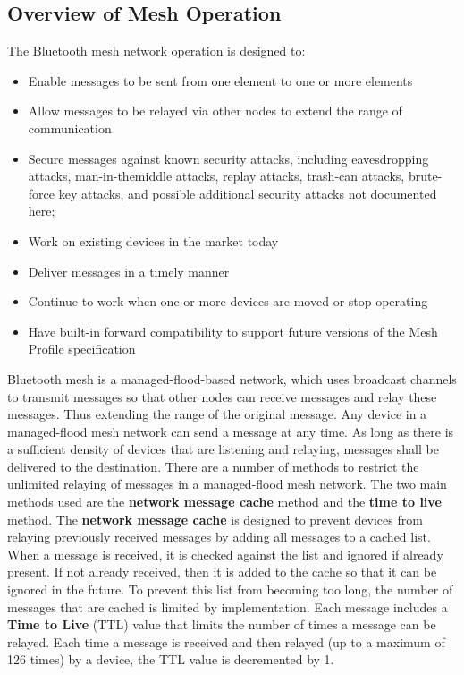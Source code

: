 \documentclass[\main/main.tex]{subfiles}
\begin{document}
\subsection{Overview of Mesh Operation \cite{bluetooth_sig:mesh_profile_specification_1_0_1}}
The Bluetooth mesh network operation is designed to:
\begin{itemize}
    \item Enable messages to be sent from one element to one or more elements
    \item Allow messages to be relayed via other nodes to extend the range of communication
    \item Secure messages against known security attacks, including eavesdropping attacks, man-in-themiddle attacks, replay attacks, trash-can attacks, brute-force key attacks, and possible additional security attacks not documented here;
    \item Work on existing devices in the market today
    \item Deliver messages in a timely manner
    \item Continue to work when one or more devices are moved or stop operating
    \item Have built-in forward compatibility to support future versions of the Mesh Profile specification
\end{itemize}

Bluetooth mesh is a managed-flood-based network, which uses  broadcast channels to transmit messages so that other nodes can receive messages and relay these messages. Thus extending the range of the original message. Any device in a managed-flood mesh network can send a message at any time. As long as there is a sufficient density of devices that are listening and relaying, messages shall be delivered to the destination. 
\newline\newline
There are a number of methods to restrict the unlimited relaying of messages in a managed-flood mesh network. The two main methods used are the \textbf{network message cache} method and the \textbf{time to live} method.
\newline\newline
The \textbf{network message cache} is designed to prevent devices from relaying previously received messages by adding all messages to a cached list. When a message is received, it is checked against the list and ignored if already present. If not already received, then it is added to the cache so that it can be ignored in the future. To prevent this list from becoming too long, the number of messages that are cached is limited by implementation.
\newline\newline
Each message includes a \textbf{Time to Live} (TTL) value that limits the number of times a message can be relayed. Each time a message is received and then relayed (up to a maximum of 126 times) by a device, the TTL value is decremented by 1.
\end{document}
